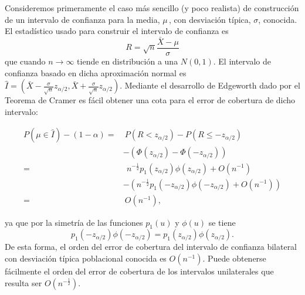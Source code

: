 \documentclass[
]{book}
\theoremstyle{break}
\theoremstyle{nonumberplain}
\begin{document}
Consideremos primeramente el caso más sencillo (y poco realista) de
construcción de un intervalo de confianza para la media, \(\mu \,\), con
desviación típica, \(\sigma\), conocida. El estadístico usado para
construir el intervalo de confianza es
\[R=\sqrt{n}\frac{\bar{X}-\mu }{\sigma }\]que cuando
\(n\rightarrow \infty\) tiende en distribución a una \(N\left(
0,1 \right)\). El intervalo de confianza basado en dicha aproximación
normal es
\(\hat{I}=\left( \bar{X}-\frac{\sigma }{\sqrt{n}}z_{\alpha /2},
\bar{X}+\frac{\sigma }{\sqrt{n}}z_{\alpha /2} \right)\). Mediante el
desarrollo de Edgeworth dado por el Teorema de Cramer es fácil obtener
una cota para el error de cobertura de dicho intervalo:

\[\begin{aligned}
P\left( \mu \in \hat{I} \right) -\left( 1-\alpha \right) =&\  P\left(
R<z_{\alpha /2} \right) -P\left( R\leq -z_{\alpha /2} \right) \\
&-\left( \Phi \left( z_{\alpha /2} \right) -\Phi \left( -z_{\alpha
/2} \right) \right) \\
=&\ \ n^{-\frac{1}{2}}p_1\left( z_{\alpha /2} \right) \phi \left( z_{\alpha
/2} \right) +O\left( n^{-1} \right) \\
&-\left( n^{-\frac{1}{2}}p_1\left( -z_{\alpha /2} \right) \phi \left(
-z_{\alpha /2} \right) +O\left( n^{-1} \right) \right) \\
=&\  O\left( n^{-1} \right),\end{aligned}\]

ya que por la simetría de las funciones \(p_1\left( u \right)\) y \(\phi
\left( u \right)\) se tiene
\[p_1\left( -z_{\alpha /2} \right) \phi \left( -z_{\alpha /2} \right)
=p_1\left( z_{\alpha /2} \right) \phi \left( z_{\alpha /2} \right).\]
De esta forma, el orden del error de cobertura del intervalo de confianza
bilateral con desviación típica poblacional conocida es \(O\left(
n^{-1} \right)\). Puede obtenerse fácilmente el orden del error de
cobertura de los intervalos unilaterales que resulta ser
\(O\left( n^{-\frac{1}{2}} \right)\).
\end{document}
